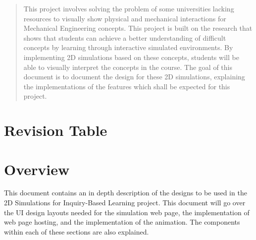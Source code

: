 \documentclass[onecolumn, draftclsnofoot,10pt, compsoc]{IEEEtran}
\begin{document}
\begin{titlepage}
\begin{singlespace}
{        }
        \begin{abstract}
This project involves solving the problem of some universities lacking resources to visually show physical and mechanical interactions for Mechanical Engineering concepts.
This project is built on the research that shows that students can achieve a better understanding of difficult concepts by learning through interactive simulated environments.
By implementing 2D simulations based on these concepts, students will be able to visually interpret the concepts in the course.
The goal of this document is to document the design for these 2D simulations, explaining the implementations of the features which shall be expected for this project.
        \end{abstract}     
    \end{singlespace}
\end{titlepage}
\newpage
{}
\tableofcontents
\clearpage





\section{Revision Table}


\section{Overview}
This document contains an in depth description of the designs to be used in the 2D Simulations for Inquiry-Based Learning project. This document will go over the UI design layouts needed for the simulation web page, the implementation of web page hosting, and the implementation of the animation. The components within each of these sections are also explained. 
\end{document}
